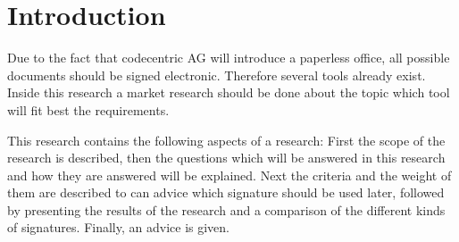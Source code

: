 \section{Introduction}
Due to the fact that codecentric AG will introduce a paperless office, all possible documents should be signed electronic. Therefore several tools already exist. Inside this research a market research should be done about the topic which tool will fit best the requirements. 

This research contains the following aspects of a research: First the scope of the research is described, then the questions which will be answered in this research and how they are answered will be explained. Next the criteria and the weight of them are described to can advice which signature should be used later, followed by presenting the results of the research and a comparison of the different kinds of signatures. Finally, an advice is given.  